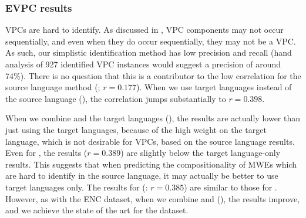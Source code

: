 \documentclass[output=paper,modfonts,nonflat]{langsci/langscibook}
\begin{document}


\subsubsection{EVPC results}

 VPCs are hard to identify. As discussed in , VPC
components may not occur sequentially, and even when they do occur
sequentially, they may not be a VPC. As such, our simplistic
identification method has low precision and recall (hand analysis of 927
identified VPC instances would suggest a precision of around 74\%). There is no
question that this is a contributor to the low correlation for the
source language method (\CSsource; $r = 0.177$). When we use target
languages instead of the source language (\CStarg), the correlation
jumps substantially to $r = 0.398$.

When we combine  and the target languages (\CSsourcetarg), the
results are actually lower than just using the target languages, because
of the high weight on the target language, which is not desirable for
VPCs, based on the source language results. Even for \CSsvr, the results
($r = 0.389$) are slightly below the target language-only results. This
suggests that when predicting the compositionality of MWEs which are
hard to identify in the source language, it may actually be better to
use target languages only. The results for  (\CSstring:
$r = 0.385$) are similar to those for \CStarg. However, as with the ENC
dataset, when we combine  and 
(\CSall), the results improve, and we achieve the state of the art for
the dataset.
\end{document}
